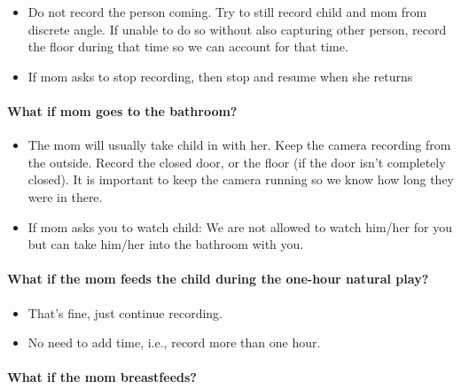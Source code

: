 \documentclass[
  12pt,
]{book}
\providecommand{\tightlist}{%
  \setlength{\itemsep}{0pt}\setlength{\parskip}{0pt}}
\begin{document}
\begin{itemize}
\tightlist
\item
  Do not record the person coming. Try to still record child and mom from discrete angle. If unable to do so without also capturing other person, record the floor during that time so we can account for that time.
\item
  If mom asks to stop recording, then stop and resume when she returns
\end{itemize}

\hypertarget{what-if-mom-goes-to-the-bathroom}{%
\paragraph*{What if mom goes to the bathroom?}\label{what-if-mom-goes-to-the-bathroom}}

\begin{itemize}
\tightlist
\item
  The mom will usually take child in with her. Keep the camera recording from the outside. Record the closed door, or the floor (if the door isn't completely closed). It is important to keep the camera running so we know how long they were in there.
\item
  If mom asks you to watch child: We are not allowed to watch him/her for you but can take him/her into the bathroom with you.
\end{itemize}

\hypertarget{what-if-the-mom-feeds-the-child-during-the-one-hour-natural-play}{%
\paragraph*{What if the mom feeds the child during the one-hour natural play?}\label{what-if-the-mom-feeds-the-child-during-the-one-hour-natural-play}}

\begin{itemize}
\tightlist
\item
  That's fine, just continue recording.
\item
  No need to add time, i.e., record more than one hour.
\end{itemize}

\hypertarget{what-if-the-mom-breastfeeds}{%
\paragraph*{What if the mom breastfeeds?}\label{what-if-the-mom-breastfeeds}}
\end{document}
